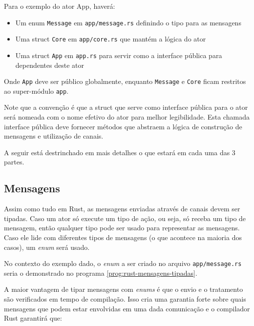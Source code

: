 Para o exemplo do ator App, haverá:

\begin{itemize}
    \item Um enum \texttt{Message} em \texttt{app/message.rs} definindo o tipo para as mensagens
    \item Uma struct \texttt{Core} em \texttt{app/core.rs} que mantém a lógica do ator
    \item Uma struct \texttt{App} em \texttt{app.rs} para servir como a interface pública para dependentes deste ator
\end{itemize}

Onde \texttt{App} deve ser público globalmente, enquanto \texttt{Message} e \texttt{Core} ficam restritos ao super-módulo \texttt{app}.

Note que a convenção é que a struct que serve como interface pública para o ator será nomeada com o nome efetivo do ator para melhor legibilidade. Esta chamada interface pública deve fornecer métodos que abstraem a lógica de construção de mensagens e utilização de canais.

A seguir está destrinchado em mais detalhes o que estará em cada uma das 3 partes.

\subsection{Mensagens}

Assim como tudo em Rust, as mensagens enviadas através de canais devem ser tipadas. Caso um ator só execute um tipo de ação, ou seja, só receba um tipo de mensagem, então qualquer tipo pode ser usado para representar as mensagens. Caso ele lide com diferentes tipos de mensagens (o que acontece na maioria dos casos), um \emph{enum} será usado.

No contexto do exemplo dado, o \emph{enum} a ser criado no arquivo \texttt{app/message.rs} seria o demonstrado no programa \ref{prog:rust-mensagens-tipadas}.

\begin{program}
  
  \caption{Exemplo de mensagens tipadas.\label{prog:rust-mensagens-tipadas}}
\end{program}

A maior vantagem de tipar mensagens com \emph{enums} é que o envio e o tratamento são verificados em tempo de compilação. Isso cria uma garantia forte sobre quais mensagens que podem estar envolvidas em uma dada comunicação e o compilador Rust garantirá que:

